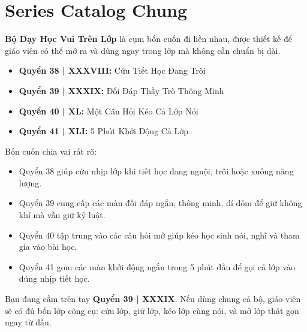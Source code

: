 \chapter*{Series Catalog Chung}

\textbf{Bộ Dạy Học Vui Trên Lớp} là cụm bốn cuốn đi liền nhau, được thiết kế để giáo viên có thể mở ra và dùng ngay trong lớp mà không cần chuẩn bị dài.

\begin{itemize}
\item \textbf{Quyển 38 | XXXVIII:} Cứu Tiết Học Đang Trôi
\item \textbf{Quyển 39 | XXXIX:} Đối Đáp Thầy Trò Thông Minh
\item \textbf{Quyển 40 | XL:} Một Câu Hỏi Kéo Cả Lớp Nói
\item \textbf{Quyển 41 | XLI:} 5 Phút Khởi Động Cả Lớp
\end{itemize}

Bốn cuốn chia vai rất rõ:

\begin{itemize}
\item Quyển 38 giúp cứu nhịp lớp khi tiết học đang nguội, trôi hoặc xuống năng lượng.
\item Quyển 39 cung cấp các màn đối đáp ngắn, thông minh, dí dỏm để giữ không khí mà vẫn giữ kỷ luật.
\item Quyển 40 tập trung vào các câu hỏi mở giúp kéo học sinh nói, nghĩ và tham gia vào bài học.
\item Quyển 41 gom các màn khởi động ngắn trong 5 phút đầu để gọi cả lớp vào đúng nhịp tiết học.
\end{itemize}

Bạn đang cầm trên tay \textbf{Quyển 39 | XXXIX}. Nếu dùng chung cả bộ, giáo viên sẽ có đủ bốn lớp công cụ: cứu lớp, giữ lớp, kéo lớp cùng nói, và mở lớp thật gọn ngay từ đầu.

